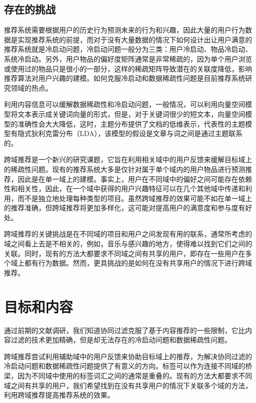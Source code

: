 
\subsection{存在的挑战} %
\label{sub:存在的挑战}
推荐系统需要根据用户的历史行为预测未来的行为和兴趣，因此大量的用户行为数据是实现推荐系统的前提，而对于没有大量数据的情况下如何设计出让用户满意的推荐系统就是冷启动问题，冷启动问题一般分为三类：用户冷启动、物品冷启动、系统冷启动。另外，用户物品的偏好度矩阵通常是非常稀疏的，因为单个用户浏览或使用过的物品只是很小的一部分，这样的稀疏矩阵导致潜在的关联度降低，影响推荐算法对用户兴趣的建模。如何克服冷启动和数据稀疏性问题是目前推荐系统研究领域的热点。

利用内容信息可以缓解数据稀疏性和冷启动问题，一般情况，可以利用向量空间模型将文本表示成关键词向量的形式，但是，对于关键词很少的短文本，向量空间模型的准确性会大大降低，这时，主题分布提供了文档的低维表示，代表性的主题模型有隐式狄利克雷分布（LDA），该模型的假设是文章与词之间是通过主题联系的。

跨域推荐是一个新兴的研究课题，它旨在利用相关域中的用户反馈来缓解目标域上的稀疏性问题。现有的推荐系统大多是仅针对属于单个域内的用户物品进行预测推荐，因此是在单一域上的建模。事实上，用户在不同域中的偏好之间可能存在依赖性和相关性，因此，在一个域中获得的用户兴趣特征可以在几个其他域中传递和利用，而不是独立地处理每种类型的项目。虽然跨域推荐的效果可能不如在单一域上的推荐准确，但跨域推荐将更加多样化，这可能对提高用户的满意度和参与度有好处。

跨域推荐的关键挑战是在不同域的项目和用户之间发现有用的联系，通常所考虑的域之间看上去是不相关的，例如，音乐与感兴趣的地方，使得难以找到它们之间的关联\cite{shi2011tags}。同时，现有的方法大都要求不同域之间有共享的用户，即存在一些用户在多个域上都有行为数据。然而，更具挑战的是如何在没有共享用户的情况下进行跨域推荐。


\section{目标和内容}
通过前期的文献调研，我们知道协同过滤克服了基于内容推荐的一些限制，它比内容过滤的技术更加精确，但是却无法存在的冷启动问题和数据稀疏性问题。

跨域推荐尝试利用辅助域中的用户反馈来协助目标域上的推荐，为解决协同过滤的冷启动问题和数据稀疏性问题提供了有意义的方向。标签可以作为连接不同域的桥梁，因为不同域中使用的标签词汇之间的通常是重叠的。现有的方法大都要求不同域之间有共享的用户，我们希望找到在没有共享用户的情况下关联多个域的方法，利用跨域推荐提高推荐系统的效果。

